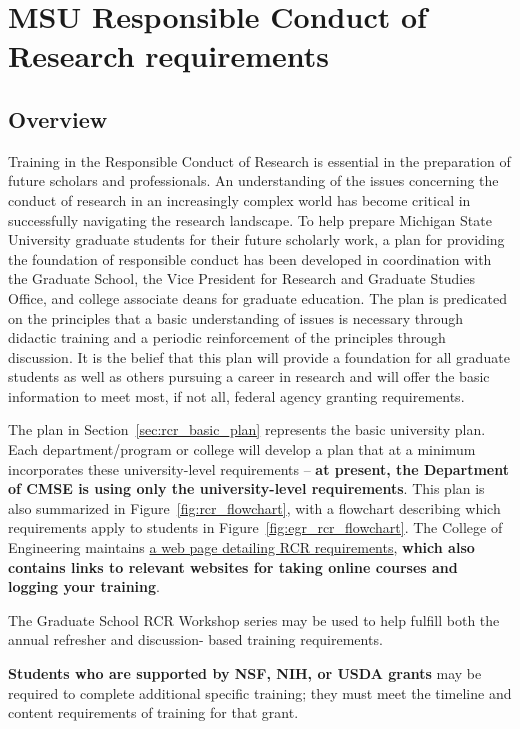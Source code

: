 \section{MSU Responsible Conduct of Research requirements}
\label{sec:rcr_requirements}

\subsection{Overview}

Training in the Responsible Conduct of Research is essential in the
preparation of future scholars and professionals. An understanding of
the issues concerning the conduct of research in an increasingly
complex world has become critical in successfully navigating the
research landscape. To help prepare Michigan State University graduate
students for their future scholarly work, a plan for providing the
foundation of responsible conduct has been developed in coordination
with the Graduate School, the Vice President for Research and Graduate
Studies Office, and college associate deans for graduate
education. The plan is predicated on the principles that a basic
understanding of issues is necessary through didactic training and a
periodic reinforcement of the principles through discussion. It is the
belief that this plan will provide a foundation for all graduate
students as well as others pursuing a career in research and will
offer the basic information to meet most, if not all, federal agency
granting requirements.

The plan in Section~\ref{sec:rcr_basic_plan} represents the basic university plan. Each
department/program or college will develop a plan that at a minimum
incorporates these university-level requirements -- \textbf{at present, the
Department of CMSE is using only the university-level requirements}.  This plan is also
summarized in Figure~\ref{fig:rcr_flowchart}, with a flowchart
describing which requirements apply to students in Figure~\ref{fig:egr_rcr_flowchart}.  The College of
Engineering maintains
\href{https://www.egr.msu.edu/academics/graduate/rcr}{a web page
  detailing RCR requirements}, \textbf{which also contains links to relevant
websites for taking online courses and logging your training}.

The Graduate School RCR Workshop series may be used to help fulfill
both the annual refresher and discussion- based training requirements.

\vspace{2mm}
\noindent
\textbf{Students who are supported by NSF, NIH, or USDA grants} may be required to complete additional specific training; they must meet the timeline and content requirements of training for that grant.

